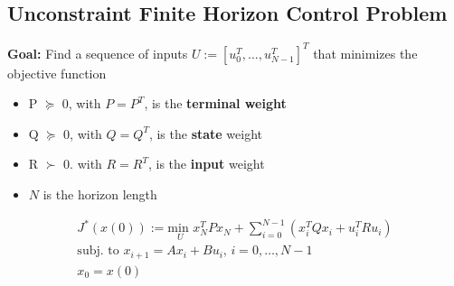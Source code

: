 \subsection{Unconstraint Finite Horizon Control Problem}
\textbf{Goal:} Find a sequence of inputs $U:=[u_0^T,\dots,u_{N-1}^T]^T$ that minimizes the objective function
\begin{itemize}
    \item P $\succeq$ 0, with $P=P^T$, is the \textbf{terminal weight}
    \item Q $\succeq$ 0, with $Q=Q^T$, is the \textbf{state} weight
    \item R $\succ$ 0. with $R=R^T$, is the \textbf{input} weight
    \item $N$ is the horizon length
\end{itemize}
\begin{gather*}
    J^*(x(0)) := \underset{U}{\textrm{min }}x_N^TPx_N+\sum^{N-1}_{i=0}(x_i^TQx_i+u_i^TRu_i)\\
    \textrm{subj. to }x_{i+1}=Ax_i+Bu_i\textrm{, } i = 0,\dots,N-1\\
    x_0 = x(0)
\end{gather*}


